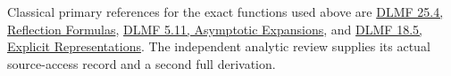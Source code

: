 Classical primary references for the exact functions used above are \href{https://dlmf.nist.gov/25.4}{DLMF 25.4, Reflection Formulas}, \href{https://dlmf.nist.gov/5.11}{DLMF 5.11, Asymptotic Expansions}, and \href{https://dlmf.nist.gov/18.5}{DLMF 18.5, Explicit Representations}. The independent analytic review supplies its actual source-access record and a second full derivation.
